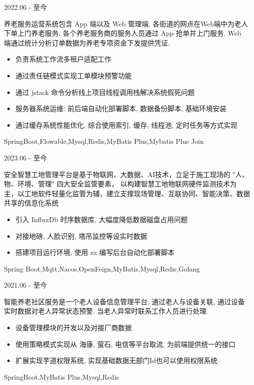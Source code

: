 \documentclass[zh]{resume}
\begin{document}
\begin{projects}
	\project
  {\color{accentcolor}{养老服务运营系统}}{2022.06 - 至今}
  {
    养老服务运营系统包含 App 端以及 Web 管理端, 各街道的网点在Web端中为老人下单上门养老服务.
    各个养老服务商的服务人员通过 App 抢单并上门服务. Web 端通过统计分析订单数据为养老专项资金下发提供凭证.
    \begin{itemize}
      \item 负责系统工作流多租户适配工作
      \item 通过责任链模式实现工单模块预警功能
      \item 通过 jstack 命令分析线上项目线程调用栈解决系统假死问题
      \item 服务器系统运维: 前后端自动化部署脚本, 数据备份脚本, 基础环境安装
      \item 通过缓存系统性能优化, 综合使用索引, 缓存, 线程池, 定时任务等方式实现
    \end{itemize}
  }
  {SpringBoot,Flowable,Mysql,Redis,MyBatis Plus,Mybatis Plus Join}

	\project
  {\color{accentcolor}{安全智慧工地管理平台}}{2023.06 - 至今}
  {
    安全智慧工地管理平台是基于物联网、大数据、AI技术，立足于施工现场的 "人、物、环境、管理" 四大安全监管要素，
    以构建智慧工地物联网硬件监测技术为主，以工地软件轻量化监管为辅，建立支撑现场管理、互联协同、智能决策、数据共享的信息化系统
    \begin{itemize}
      \item 引入 InfluxDb 时序数据库, 大幅度降低数据磁盘占用问题
      \item 对接地磅, 人脸识别, 塔吊监控等设实时数据
      \item 搭建项目运行环境, 使用 zx 编写后台自动化部署脚本
    \end{itemize}
  }
  {Spring Boot,Mqtt,Nacos,OpenFeign,MyBatis,Mysql,Redis,Golang}

	\project
  {\color{accentcolor}{智能养老社区服务}}{2021.06 - 至今}
  {
    智能养老社区服务是一个老人设备信息管理平台, 通过老人与设备关联, 通过设备实时数据对老人异常状态预警.
    当老人异常时联系工作人员进行处理.
    \begin{itemize}
      \item 设备管理模块的开发以及对接厂商数据
      \item 使用策略模式实现从 海康, 萤石, 电信等平台取流, 为前端提供统一的接口
      \item 扩展实现芋道权限系统, 实现基础数据无部门Id也可以使用权限系统
    \end{itemize}
  }
  {SpringBoot,MyBatis Plus,Mysql,Redis}


\end{projects}
\end{document}
